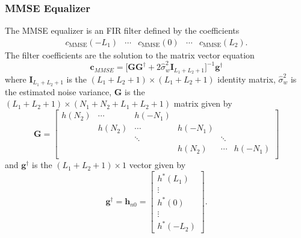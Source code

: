 \subsubsection{MMSE Equalizer}

The MMSE equalizer is an FIR filter defined by the coefficients
\begin{equation}
\begin{matrix}
c_\text{MMSE}(-L_1) & \cdots & c_\text{MMSE}(0) & \cdots & c_\text{MMSE}(L_2).
\end{matrix}
\end{equation}
The filter coefficients are the solution to the matrix vector equation \cite[eq. (330) and (333)]{PAQ-phase1}
\begin{equation}
\mathbf{c}_{MMSE} = \big[ \mathbf{G}\mathbf{G}^\dagger + 2\hat{\sigma}^2_w\mathbf{I}_{L_1+L_2+1} \big]^{-1} \mathbf{g}^\dagger
\label{eq:c_MMSE_direct}
\end{equation}
where $\mathbf{I}_{L_1+L_2+1}$ is the $(L_1+L_2+1)\times(L_1+L_2+1)$ identity matrix,
$\hat{\sigma}^2_w$ is the estimated noise variance, $\mathbf{G}$ is the $(L_1+L_2+1)\times(N_1+N_2+L_1+L_2+1)$ matrix given by
\begin{equation}
\mathbf{G} = 
		\begin{bmatrix}
		h(N_2)		& \cdots	& h(-N_1) 	&  			\\
					& h(N_2)	& \cdots 	& h(-N_1)	\\
				 	& 			& \ddots 	&  			& \ddots	\\
		 			&  	   		&  			& h(N_2)	& \cdots	& h(-N_1)	\\
	\end{bmatrix}
\end{equation}
and $\mathbf{g}^\dagger$ is the $(L_1+L_2+1)\times1$ vector given by
\begin{equation}
\mathbf{g}^\dagger = \mathbf{h}_{n0} = \begin{bmatrix} h^\ast(L_1) \\ \vdots \\ h^\ast(0) \\ \vdots \\ h^\ast(-L_2)  \end{bmatrix}.
\label{eq:g_dagger_h_n0}
\end{equation}

